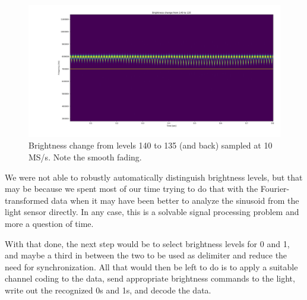 \begin{figure}[h]
	\centering
	\includegraphics[width=14cm]{img/Plot_140_135.png}
	\caption{Brightness change from levels 140 to 135 (and back) sampled at 10 MS/s. Note the smooth fading.}
	\label{fig:plot-140-135}
\end{figure}

We were not able to robustly automatically distinguish brightness levels, but that may be because we spent most of our time trying to do that with the Fourier-transformed data when it may have been better to analyze the sinusoid from the light sensor directly.
In any case, this is a solvable signal processing problem and more a question of time.

With that done, the next step would be to select brightness levels for 0 and 1, and maybe a third in between the two to be used as delimiter and reduce the need for synchronization.
All that would then be left to do is to apply a suitable channel coding to the data, send appropriate brightness commands to the light, write out the recognized 0s and 1s, and decode the data.
